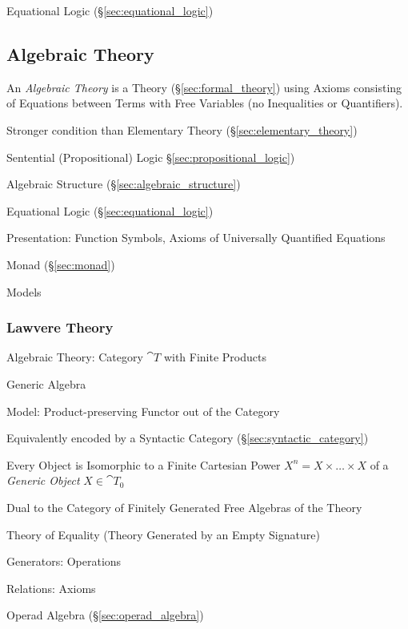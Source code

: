 Equational Logic (\S\ref{sec:equational_logic})



\subsection{Algebraic Theory}\label{sec:algebraic_theory}

An \emph{Algebraic Theory} is a Theory (\S\ref{sec:formal_theory})
using Axioms consisting of Equations between Terms with Free Variables
(no Inequalities or Quantifiers).

Stronger condition than Elementary Theory
(\S\ref{sec:elementary_theory})

Sentential (Propositional) Logic \S\ref{sec:propositional_logic})

Algebraic Structure (\S\ref{sec:algebraic_structure})

Equational Logic (\S\ref{sec:equational_logic})

Presentation: Function Symbols, Axioms of Universally Quantified
Equations

Monad (\S\ref{sec:monad})

Models



\subsubsection{Lawvere Theory}\label{sec:lawvere_theory}

Algebraic Theory: Category $\cat{T}$ with Finite Products

Generic Algebra

Model: Product-preserving Functor out of the Category

Equivalently encoded by a Syntactic Category
(\S\ref{sec:syntactic_category})

Every Object is Isomorphic to a Finite Cartesian Power $X^n = X \times
\ldots \times X$ of a \emph{Generic Object} $X \in \cat{T}_0$

Dual to the Category of Finitely Generated Free Algebras of the Theory

Theory of Equality (Theory Generated by an Empty Signature)

Generators: Operations

Relations: Axioms

Operad Algebra (\S\ref{sec:operad_algebra})



